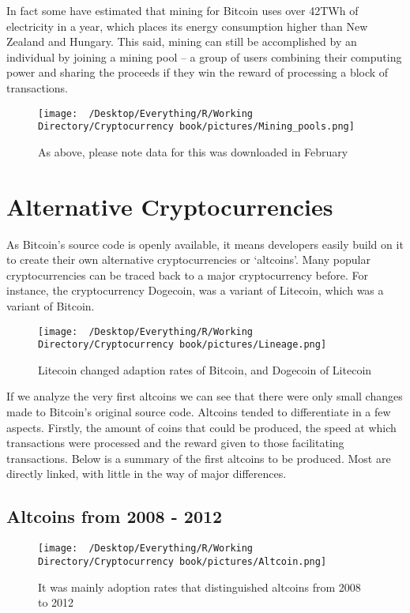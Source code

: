 \documentclass[]{book}
\theoremstyle{definition}
\theoremstyle{definition}
\theoremstyle{definition}
\theoremstyle{remark}
\begin{document}
In fact some have estimated that mining for Bitcoin uses over 42TWh of
electricity in a year, which places its energy consumption higher than
New Zealand and Hungary. This said, mining can still be accomplished by
an individual by joining a mining pool -- a group of users combining
their computing power and sharing the proceeds if they win the reward of
processing a block of transactions.

\begin{figure}[htbp]
\centering
\texttt{[image: ~/Desktop/Everything/R/Working Directory/Cryptocurrency book/pictures/Mining\_pools.png]}
\caption{As above, please note data for this was downloaded in February}
\end{figure}

\chapter{Alternative
Cryptocurrencies}\label{alternative-cryptocurrencies}

As Bitcoin's source code is openly available, it means developers easily
build on it to create their own alternative cryptocurrencies or
`altcoins'. Many popular cryptocurrencies can be traced back to a major
cryptocurrency before. For instance, the cryptocurrency Dogecoin, was a
variant of Litecoin, which was a variant of Bitcoin.

\begin{figure}[htbp]
\centering
\texttt{[image: ~/Desktop/Everything/R/Working Directory/Cryptocurrency book/pictures/Lineage.png]}
\caption{Litecoin changed adaption rates of Bitcoin, and Dogecoin of
Litecoin}
\end{figure}

If we analyze the very first altcoins we can see that there were only
small changes made to Bitcoin's original source code. Altcoins tended to
differentiate in a few aspects. Firstly, the amount of coins that could
be produced, the speed at which transactions were processed and the
reward given to those facilitating transactions. Below is a summary of
the first altcoins to be produced. Most are directly linked, with little
in the way of major differences.

\section{Altcoins from 2008 - 2012}\label{altcoins-from-2008---2012}

\begin{figure}[htbp]
\centering
\texttt{[image: ~/Desktop/Everything/R/Working Directory/Cryptocurrency book/pictures/Altcoin.png]}
\caption{It was mainly adoption rates that distinguished altcoins from
2008 to 2012}
\end{figure}
\end{document}
